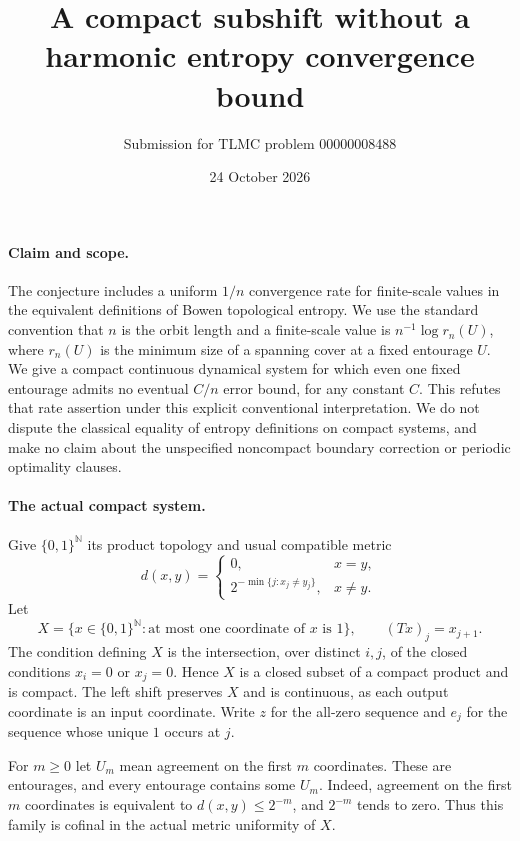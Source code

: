 \documentclass[11pt,a4paper]{article}
\title{A compact subshift without a harmonic entropy convergence bound}
\author{Submission for TLMC problem 00000008488}
\date{24 October 2026}
\newcommand{\N}{\mathbb N}
\begin{document}
\maketitle

\paragraph{Claim and scope.}
The conjecture includes a uniform $1/n$ convergence rate for finite-scale
values in the equivalent definitions of Bowen topological entropy. We use
the standard convention that $n$ is the orbit length and a finite-scale value
is $n^{-1}\log r_n(U)$, where $r_n(U)$ is the minimum size of a spanning cover
at a fixed entourage $U$. We give a compact continuous dynamical system for
which even one fixed entourage admits no eventual $C/n$ error bound, for any
constant $C$. This refutes that rate assertion under this explicit conventional
interpretation. We do not dispute the classical equality of entropy definitions
on compact systems, and make no claim about the unspecified noncompact
boundary correction or periodic optimality clauses.

\paragraph{The actual compact system.}
Give $\{0,1\}^{\N}$ its product topology and usual compatible metric
\[
d(x,y)=\begin{cases}
0,&x=y,\\
2^{-\min\{j:x_j\ne y_j\}},&x\ne y.
\end{cases}
\]
Let
\[
X=\{x\in\{0,1\}^{\N}:\text{at most one coordinate of }x\text{ is }1\},
\qquad (Tx)_j=x_{j+1}.
\]
The condition defining $X$ is the intersection, over distinct $i,j$, of the
closed conditions $x_i=0$ or $x_j=0$. Hence $X$ is a closed subset of a compact
product and is compact. The left shift preserves $X$ and is continuous,
as each output coordinate is an input coordinate. Write $z$ for the all-zero
sequence and $e_j$ for the sequence whose unique $1$ occurs at $j$.

For $m\geq0$ let $U_m$ mean agreement on the first $m$ coordinates. These
are entourages, and every entourage contains some $U_m$. Indeed, agreement
on the first $m$ coordinates is equivalent to $d(x,y)\leq2^{-m}$, and
$2^{-m}$ tends to zero. Thus this family is cofinal in the actual metric
uniformity of $X$.
\end{document}
